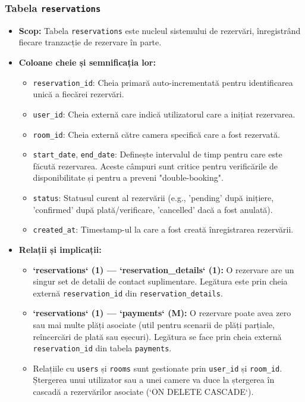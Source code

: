 \documentclass[12pt, a4paper, oneside, romanian]{teza-upb}
\begin{document}
\subsubsection{Tabela \texttt{reservations}}
\begin{itemize}
	\item \textbf{Scop:} Tabela \texttt{reservations} este nucleul sistemului de rezervări, înregistrând fiecare tranzacție de rezervare în parte.
	\item \textbf{Coloane cheie și semnificația lor:}
	\begin{itemize}
		\item \texttt{reservation\_id}: Cheia primară auto-incrementată pentru identificarea unică a fiecărei rezervări.
		\item \texttt{user\_id}: Cheia externă care indică utilizatorul care a inițiat rezervarea.
		\item \texttt{room\_id}: Cheia externă către camera specifică care a fost rezervată.
		\item \texttt{start\_date}, \texttt{end\_date}: Definește intervalul de timp pentru care este făcută rezervarea. Aceste câmpuri sunt critice pentru verificările de disponibilitate și pentru a preveni "double-booking".
		\item \texttt{status}: Statusul curent al rezervării (e.g., 'pending' după inițiere, 'confirmed' după plată/verificare, 'cancelled' dacă a fost anulată).
		\item \texttt{created\_at}: Timestamp-ul la care a fost creată înregistrarea rezervării.
	\end{itemize}

	\item \textbf{Relații și implicații:}
	\begin{itemize}
		\item \textbf{`reservations` (1) --- `reservation\_details` (1):} O rezervare are un singur set de detalii de contact suplimentare. Legătura este prin cheia externă \texttt{reservation\_id} din \texttt{reservation\_details}.
		\item \textbf{`reservations` (1) --- `payments` (M):} O rezervare poate avea zero sau mai multe plăți asociate (util pentru scenarii de plăți parțiale, reîncercări de plată sau eșecuri). Legătura se face prin cheia externă \texttt{reservation\_id} din tabela \texttt{payments}.
		\item Relațiile cu \texttt{users} și \texttt{rooms} sunt gestionate prin \texttt{user\_id} și \texttt{room\_id}. Ștergerea unui utilizator sau a unei camere va duce la ștergerea în cascadă a rezervărilor asociate (`ON DELETE CASCADE`).
	\end{itemize}
\end{itemize}
\end{document}
